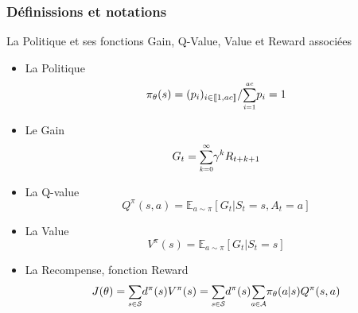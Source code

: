 \documentclass[8pt]{beamer}
\begin{document}
\begin{frame}

  \frametitle{Définissions et notations}

  \begin{block}{La Politique et ses fonctions Gain, Q-Value, Value et Reward associées}
    \begin{itemize}
    \item La Politique
      \begin{equation} \pi_{\theta}(s) = (p_i)_{i \in \llbracket 1, ac \rrbracket} / {\scalebox{0.85}{$\displaystyle \sum_{i = 1}^{ac}$}}p_i = 1  \end{equation}
    \item Le Gain
      \begin{equation} G_t = {\scalebox{0.85}{$\displaystyle \sum_{k=0}^{\infty}$}} \gamma^k R_{t+k+1} \end{equation}
    \item La Q-value
      \begin{equation} Q^\pi(s, a) = \mathbb{E}_{a\sim \pi} [G_t \vert S_t = s, A_t = a] \end{equation}
    \item La Value
      \begin{equation} V^\pi (s) = \mathbb{E}_{a\sim \pi} [G_t \vert S_t = s] \end{equation}
    \item La Recompense, fonction Reward
      \begin{equation} J(\theta) 
= {\scalebox{0.85}{$\displaystyle \sum_{s \in \mathcal{S}}$}} d^\pi(s) V^\pi(s) 
= {\scalebox{0.85}{$\displaystyle \sum_{s \in \mathcal{S}}$}} d^\pi(s) {\scalebox{0.85}{$\displaystyle  \sum_{a \in \mathcal{A}}$}} \pi_\theta(a \vert s) Q^\pi(s, a) \end{equation}
    \end{itemize}
  \end{block}
  
\end{frame}
\end{document}
